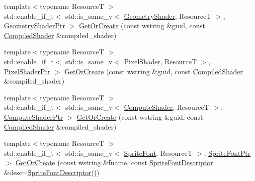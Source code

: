 \begin{DoxyCompactItemize}
\item 
{\footnotesize template$<$typename ResourceT $>$ }\\std\+::enable\+\_\+if\+\_\+t$<$ std\+::is\+\_\+same\+\_\+v$<$ \mbox{\hyperlink{namespacemage_1_1rendering_accaa3591de8a0d7a2c72c1dcc0cf9592}{Geometry\+Shader}}, ResourceT $>$, \mbox{\hyperlink{namespacemage_1_1rendering_aa5d63f80f9483d0896718813768ba1cf}{Geometry\+Shader\+Ptr}} $>$ \mbox{\hyperlink{classmage_1_1rendering_1_1_resource_manager_acb35a9671a7b9c7a8f2e7cb5914282e2}{Get\+Or\+Create}} (const wstring \&guid, const \mbox{\hyperlink{classmage_1_1rendering_1_1_compiled_shader}{Compiled\+Shader}} \&compiled\+\_\+shader)
\item 
{\footnotesize template$<$typename ResourceT $>$ }\\std\+::enable\+\_\+if\+\_\+t$<$ std\+::is\+\_\+same\+\_\+v$<$ \mbox{\hyperlink{namespacemage_1_1rendering_a19905114913398d5073148f6c416e1b7}{Pixel\+Shader}}, ResourceT $>$, \mbox{\hyperlink{namespacemage_1_1rendering_af03d922b228ee9c8542baaa2ecc9f259}{Pixel\+Shader\+Ptr}} $>$ \mbox{\hyperlink{classmage_1_1rendering_1_1_resource_manager_a19ec0a56d1311f82d32a564bdf8a6bd0}{Get\+Or\+Create}} (const wstring \&guid, const \mbox{\hyperlink{classmage_1_1rendering_1_1_compiled_shader}{Compiled\+Shader}} \&compiled\+\_\+shader)
\item 
{\footnotesize template$<$typename ResourceT $>$ }\\std\+::enable\+\_\+if\+\_\+t$<$ std\+::is\+\_\+same\+\_\+v$<$ \mbox{\hyperlink{namespacemage_1_1rendering_aa67e55ba4dca44d39b0367b31f091863}{Compute\+Shader}}, ResourceT $>$, \mbox{\hyperlink{namespacemage_1_1rendering_ab3dc9f2114f2e9255b91d9c051da52ea}{Compute\+Shader\+Ptr}} $>$ \mbox{\hyperlink{classmage_1_1rendering_1_1_resource_manager_a7d84eac42a5aee44bc3d8007b0eb408e}{Get\+Or\+Create}} (const wstring \&guid, const \mbox{\hyperlink{classmage_1_1rendering_1_1_compiled_shader}{Compiled\+Shader}} \&compiled\+\_\+shader)
\item 
{\footnotesize template$<$typename ResourceT $>$ }\\std\+::enable\+\_\+if\+\_\+t$<$ std\+::is\+\_\+same\+\_\+v$<$ \mbox{\hyperlink{classmage_1_1rendering_1_1_sprite_font}{Sprite\+Font}}, ResourceT $>$, \mbox{\hyperlink{namespacemage_1_1rendering_ab2f34196c20422ca3692ad3f3bff3a5d}{Sprite\+Font\+Ptr}} $>$ \mbox{\hyperlink{classmage_1_1rendering_1_1_resource_manager_a664a3fd14471c1e1d7128b90b66644b9}{Get\+Or\+Create}} (const wstring \&fname, const \mbox{\hyperlink{classmage_1_1rendering_1_1_sprite_font_descriptor}{Sprite\+Font\+Descriptor}} \&desc=\mbox{\hyperlink{classmage_1_1rendering_1_1_sprite_font_descriptor}{Sprite\+Font\+Descriptor}}())

\end{DoxyCompactItemize}
